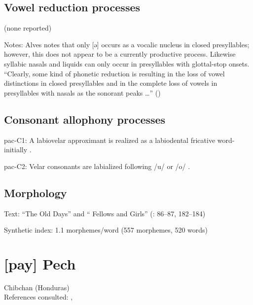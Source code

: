 {\subsection*{Vowel reduction processes}

(none reported)
\begin{appendixdesc}

\item[Notes:] Alves notes that only [ə] occurs as a vocalic nucleus in closed presyllables; however, this does not appear to be a currently productive process. Likewise syllabic nasals and liquids can only occur in presyllables with glottal-stop onsets. “Clearly, some kind of phonetic reduction is resulting in the loss of vowel distinctions in closed presyllables and in the complete loss of vowels in presyllables with nasals as the sonorant peaks …” (\citeyear[22]{Alves2000})
\end{appendixdesc}
\subsection*{Consonant allophony processes}
\begin{appendixdesc}

\item[pac-C1:] A labiovelar approximant is realized as a labiodental fricative word-initially \citep[11]{Alves2006}.

\item[pac-C2:] Velar consonants are labialized following /u/ or /o/ \citep[12]{Alves2006}.
\end{appendixdesc}
\subsection*{Morphology}

\begin{appendixdesc}

\item[Text:] “The Old Days” and “ Fellows and Girls” (\citealt{Watson1980}: 86--87, 182--184)

\item[Synthetic index:] 1.1 morphemes/word (557 morphemes, 520 words)
\end{appendixdesc}
\section*{[pay] Pech}  %
Chibchan (Honduras)\medskip\\
References consulted: \citet{Holt1986}, \citet{Holt1999}

}
